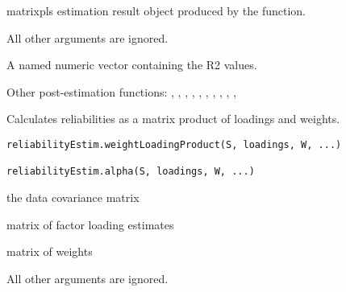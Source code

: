 \documentclass[a4paper]{book}
\begin{document}
%
\begin{Arguments}
\begin{ldescription}
\item[\code{object}] matrixpls estimation result object produced by the  function.

\item[\code{...}] All other arguments are ignored.
\end{ldescription}
\end{Arguments}
%
\begin{Value}
A named numeric vector containing the R2 values.
\end{Value}
%
\begin{SeeAlso}\relax
Other post-estimation functions: 
,
,
,
,
,
,
,
,
,
,
\end{SeeAlso}
%
\begin{Description}\relax
Calculates reliabilities as a matrix product of loadings and weights.
\end{Description}
%
\begin{Usage}
\begin{verbatim}
reliabilityEstim.weightLoadingProduct(S, loadings, W, ...)

reliabilityEstim.alpha(S, loadings, W, ...)
\end{verbatim}
\end{Usage}
%
\begin{Arguments}
\begin{ldescription}
\item[\code{S}] the data covariance matrix

\item[\code{loadings}] matrix of factor loading estimates

\item[\code{W}] matrix of weights

\item[\code{...}] All other arguments are ignored.
\end{ldescription}
\end{Arguments}
\end{document}
